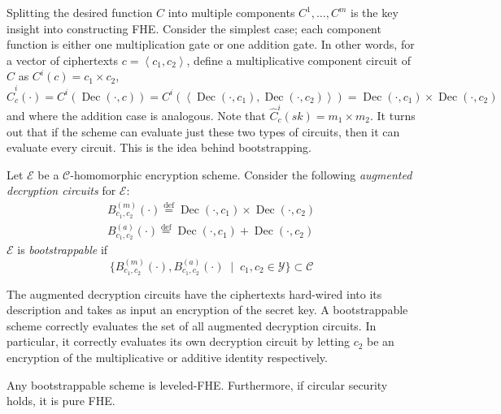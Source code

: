 Splitting the desired function $C$ into multiple components $C^1, \dots, C^m$ is the key insight into constructing FHE. Consider the simplest case; each component function is either one multiplication gate or one addition gate. In other words, for a vector of ciphertexts $c = \left\langle c_1, c_2 \right\rangle$, define a multiplicative component circuit of $C$ as $C^i(c) = c_1 \times c_2$, $\hat{C}^i_c(\cdot) = C^i(\operatorname{Dec}(\cdot, c)) = C^i(\left\langle \operatorname{Dec}(\cdot, c_1), \operatorname{Dec}(\cdot, c_2) \right\rangle) = \operatorname{Dec}(\cdot, c_1) \times \operatorname{Dec}(\cdot, c_2)$ and where the addition case is analogous. Note that $\hat{C}^i_c(sk) = m_1 \times m_2$. It turns out that if the scheme can evaluate just these two types of circuits, then it can evaluate every circuit. This is the idea behind bootstrapping.
\begin{definition}
    Let $\mathcal{E}$ be a $\mathcal{C}$-homomorphic encryption scheme. Consider the following \emph{augmented decryption circuits} for $\mathcal{E}$:
    \begin{equation*}
    \begin{aligned}        
        B_{c_1,c_2}^{(m)}(\cdot) \stackrel{\mathrm{def}}{=} \operatorname{Dec}(\cdot, c_1) \times \operatorname{Dec}(\cdot, c_2)\\
        B_{c_1,c_2}^{(a)}(\cdot) \stackrel{\mathrm{def}}{=} \operatorname{Dec}(\cdot, c_1) + \operatorname{Dec}(\cdot, c_2)
    \end{aligned}
    \end{equation*}
    $\mathcal{E}$ is \emph{bootstrappable} if
    \begin{equation*}
    \{B_{c_1,c_2}^{(m)}(\cdot), B_{c_1,c_2}^{(a)}(\cdot) \; \mid \; c_1, c_2 \in \mathcal{Y}\} \subset \mathcal{C}
    \end{equation*}
\end{definition}
The augmented decryption circuits have the ciphertexts hard-wired into its description and takes as input an encryption of the secret key. A bootstrappable scheme correctly evaluates the set of all augmented decryption circuits. In particular, it correctly evaluates its own decryption circuit by letting $c_2$ be an encryption of the multiplicative or additive identity respectively.
\begin{theorem}
Any bootstrappable scheme is leveled-FHE. Furthermore, if circular security holds, it is pure FHE.
\end{theorem}
